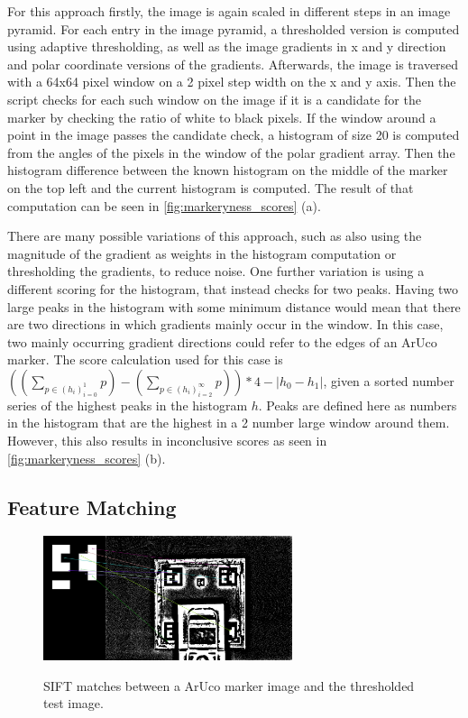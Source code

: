 \documentclass[10pt]{book}
\newcommand{\figureref}[1]{\autoref{#1}}
\begin{document}
For this approach firstly, the image is again scaled in different steps in an image pyramid. For each entry in the image pyramid, a thresholded version is computed using adaptive thresholding, as well as the image gradients in x and y direction and polar coordinate versions of the gradients. Afterwards, the image is traversed with a 64x64 pixel window on a 2 pixel step width on the x and y axis. Then the script checks for each such window on the image if it is a candidate for the marker by checking the ratio of white to black pixels. If the window around a point in the image passes the candidate check, a histogram of size 20 is computed from the angles of the pixels in the window of the polar gradient array. Then the histogram difference between the known histogram on the middle of the marker on the top left and the current histogram is computed. The result of that computation can be seen in \figureref{fig:markeryness_scores} (a). 

There are many possible variations of this approach, such as also using the magnitude of the gradient as weights in the histogram computation or thresholding the gradients, to reduce noise. One further variation is using a different scoring for the histogram, that instead checks for two peaks. Having two large peaks in the histogram with some minimum distance would mean that there are two directions in which gradients mainly occur in the window. In this case, two mainly occurring gradient directions could refer to the edges of an \ac{ArUco} marker. The score calculation used for this case is $((\sum_{p \in (h_i)^1_{i=0}}p) - (\sum_{p \in (h_i)^\infty_{i=2}}p)) * 4 - |h_0 - h_1|$, given a sorted number series of the highest peaks in the histogram $h$. Peaks are defined here as numbers in the histogram that are the highest in a 2 number large window around them. However, this also results in inconclusive scores as seen in \figureref{fig:markeryness_scores} (b).

\subsection{Feature Matching}

\begin{figure}
  \caption{\ac{SIFT} matches between a \ac{ArUco} marker image and the thresholded test image.}
  \includegraphics[width=0.65\textwidth]{image/classic_sift_matches}
  \label{fig:classic_sift_matches}
\end{figure}
\end{document}
